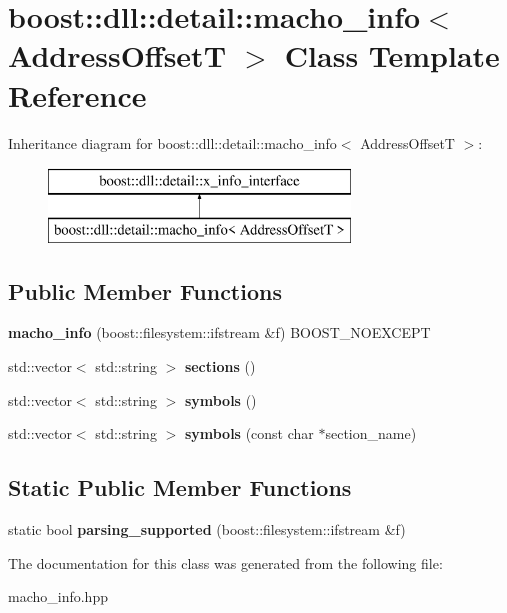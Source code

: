 \hypertarget{a01572}{}\section{boost\+:\+:dll\+:\+:detail\+:\+:macho\+\_\+info$<$ Address\+OffsetT $>$ Class Template Reference}
\label{a01572}
Inheritance diagram for boost\+:\+:dll\+:\+:detail\+:\+:macho\+\_\+info$<$ Address\+OffsetT $>$\+:\begin{figure}[H]
\begin{center}
\leavevmode
\includegraphics[height=2.000000cm]{a01572}
\end{center}
\end{figure}
\subsection*{Public Member Functions}
\begin{DoxyCompactItemize}
\item 
\mbox{\label{a01572_a08bfca5d9a4e5c054bca9d19403e12cb}} 
{\bfseries macho\+\_\+info} (boost\+::filesystem\+::ifstream \&f) B\+O\+O\+S\+T\+\_\+\+N\+O\+E\+X\+C\+E\+PT
\item 
\mbox{\label{a01572_a5603b35ac4c0693171cb599f445393db}} 
std\+::vector$<$ std\+::string $>$ {\bfseries sections} ()
\item 
\mbox{\label{a01572_a90b4d8fbb81d373ee28a4b39ec4b9619}} 
std\+::vector$<$ std\+::string $>$ {\bfseries symbols} ()
\item 
\mbox{\label{a01572_aa2a7f51eae5236803aeb7bf4b242b7cd}} 
std\+::vector$<$ std\+::string $>$ {\bfseries symbols} (const char $\ast$section\+\_\+name)
\end{DoxyCompactItemize}
\subsection*{Static Public Member Functions}
\begin{DoxyCompactItemize}
\item 
\mbox{\label{a01572_aa6195fe2c2a18d5348627a337ee77be3}} 
static bool {\bfseries parsing\+\_\+supported} (boost\+::filesystem\+::ifstream \&f)
\end{DoxyCompactItemize}


The documentation for this class was generated from the following file\+:\begin{DoxyCompactItemize}
\item 
macho\+\_\+info.\+hpp\end{DoxyCompactItemize}
